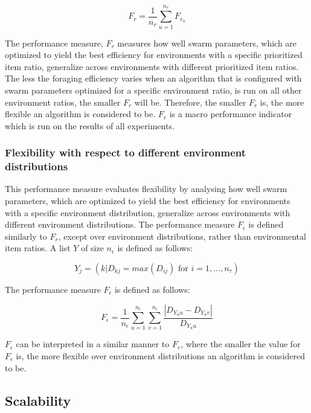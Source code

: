 \begin{equation}
F_r = \dfrac{1}{n_r}\sum_{u=1}^{n_r} F_{r_u}
\end{equation}

The performance measure, $F_r$ measures how well swarm parameters, which are optimized to yield the best efficiency for environments with a specific prioritized item ratio, generalize across environments with different prioritized item ratios. The less the foraging efficiency varies when an algorithm that is configured with swarm parameters optimized for a specific environment ratio, is run on all other environment ratios, the smaller $F_r$ will be. Therefore, the smaller $F_r$ is, the more flexible an algorithm is considered to be. $F_r$ is a macro performance indicator which is run on the results of all experiments. 


\subsubsection{Flexibility with respect to different environment distributions}
\label{setup:flexibility:environmentdistributions}


This performance measure evaluates flexibility by analysing how well swarm parameters, which are optimized to yield the best efficiency for environments with a specific environment distribution, generalize across environments with different environment distributions. The performance measure $F_{\epsilon}$ is defined similarly to $F_r$, except over environment distributions, rather than environmental item ratios. A list $Y$ of size $n_\epsilon$ is defined as follows:

\begin{equation}
Y_j = ( k | D_{kj} = max(D_{ij}) \text{ for } i = 1,...,n_\tau)
\end{equation}

The performance measure $F_\epsilon$ is defined as follows:

\begin{equation}
F_\epsilon = \dfrac{1}{n_\epsilon}\sum_{u=1}^{n_\epsilon} \sum_{v=1}^{n_\epsilon}\dfrac{|D_{Y_uu}- D_{Y_uv}|}{D_{Y_uu}}
\end{equation}

$F_\epsilon$ can be interpreted in a similar manner to $F_r$, where the smaller the value for $F_\epsilon$ is, the more flexible over environment distributions an algorithm is considered to be. 

\subsection{Scalability}
\label{setup:scalability}


